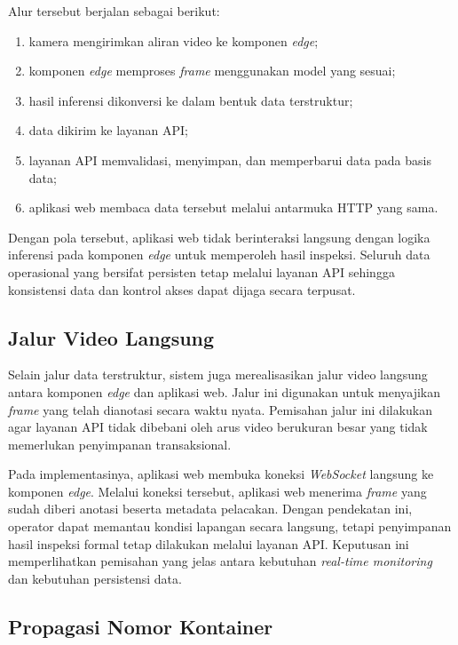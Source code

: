Alur tersebut berjalan sebagai berikut:
\begin{enumerate}
    \item kamera mengirimkan aliran video ke komponen \textit{edge};
    \item komponen \textit{edge} memproses \textit{frame} menggunakan model yang
    sesuai;
    \item hasil inferensi dikonversi ke dalam bentuk data terstruktur;
    \item data dikirim ke layanan API;
    \item layanan API memvalidasi, menyimpan, dan memperbarui data pada basis
    data;
    \item aplikasi web membaca data tersebut melalui antarmuka HTTP yang sama.
\end{enumerate}

Dengan pola tersebut, aplikasi web tidak berinteraksi langsung dengan logika
inferensi pada komponen \textit{edge} untuk memperoleh hasil inspeksi. Seluruh
data operasional yang bersifat persisten tetap melalui layanan API sehingga
konsistensi data dan kontrol akses dapat dijaga secara terpusat.

\subsection{Jalur Video Langsung}
\label{subsec:jalur-video-langsung}

Selain jalur data terstruktur, sistem juga merealisasikan jalur video langsung
antara komponen \textit{edge} dan aplikasi web. Jalur ini digunakan untuk
menyajikan \textit{frame} yang telah dianotasi secara waktu nyata. Pemisahan
jalur ini dilakukan agar layanan API tidak dibebani oleh arus video berukuran
besar yang tidak memerlukan penyimpanan transaksional.

Pada implementasinya, aplikasi web membuka koneksi \textit{WebSocket} langsung ke
komponen \textit{edge}. Melalui koneksi tersebut, aplikasi web menerima
\textit{frame} yang sudah diberi anotasi beserta metadata pelacakan. Dengan
pendekatan ini, operator dapat memantau kondisi lapangan secara langsung, tetapi
penyimpanan hasil inspeksi formal tetap dilakukan melalui layanan API. Keputusan
ini memperlihatkan pemisahan yang jelas antara kebutuhan \textit{real-time
monitoring} dan kebutuhan persistensi data.

\subsection{Propagasi Nomor Kontainer}
\label{subsec:propagasi-nomor-kontainer}

